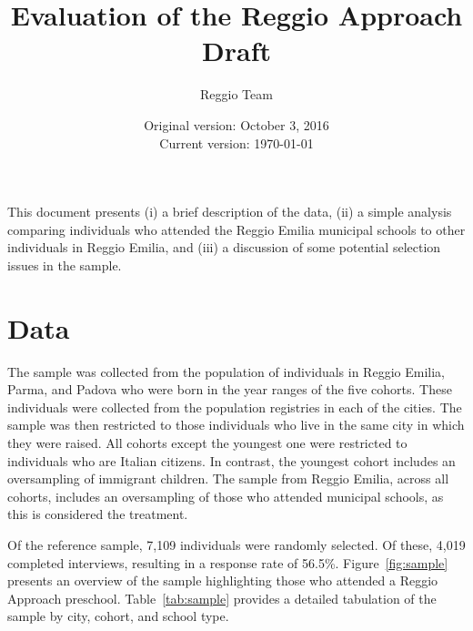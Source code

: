 




\title{Evaluation of the Reggio Approach \\ Draft}
\author{Reggio Team}
\date{Original version: October 3, 2016 \\ Current version: \today}
\maketitle

\doublespacing

This document presents (i) a brief description of the data, (ii) a simple analysis comparing individuals who attended the Reggio Emilia municipal schools to other individuals in Reggio Emilia, and (iii) a discussion of some potential selection issues in the sample.

\section{Data}
\label{sec:data}

The sample was collected from the population of individuals in Reggio Emilia, Parma, and Padova who were born in the year ranges of the five cohorts.  These individuals were collected from the population registries in each of the cities. The sample was then restricted to those individuals who live in the same city in which they were raised. All cohorts except the youngest one were restricted to individuals who are Italian citizens. In contrast, the youngest cohort includes an oversampling of immigrant children. The sample from Reggio Emilia, across all cohorts, includes an oversampling of those who attended municipal schools, as this is considered the treatment.

Of the reference sample, 7,109 individuals were randomly selected. Of these, 4,019 completed interviews, resulting in a response rate of 56.5\%. Figure~\ref{fig:sample} presents an overview of the sample highlighting those who attended a Reggio Approach preschool. Table~\ref{tab:sample} provides a detailed tabulation of the sample by city, cohort, and school type.

